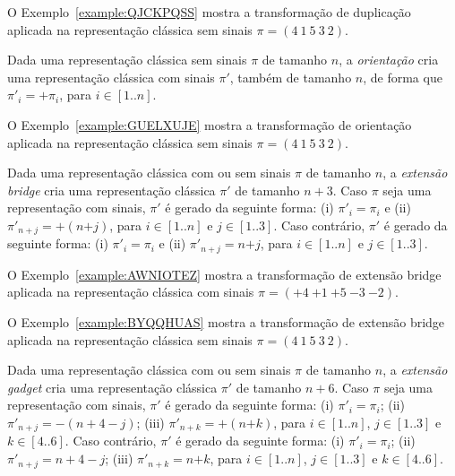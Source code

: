 O Exemplo~\ref{example:QJCKPQSS} mostra a transformação de duplicação aplicada na representação clássica sem sinais $\pi=(4~1~5~3~2)$.



\begin{definition}
Dada uma representação clássica sem sinais $\pi$ de tamanho $n$, a \emph{orientação} cria uma representação clássica com sinais $\pi'$, também de tamanho $n$, de forma que $\pi'_{i} = +\pi_i$, para $i \in [1..n]$.
\end{definition}

O Exemplo~\ref{example:GUELXUJE} mostra a transformação de orientação aplicada na representação clássica sem sinais $\pi=(4~1~5~3~2)$.



\begin{definition}
Dada uma representação clássica com ou sem sinais $\pi$ de tamanho $n$, a \emph{extensão bridge} cria uma representação clássica $\pi'$ de tamanho $n + 3$. Caso $\pi$ seja uma representação com sinais, $\pi'$ é gerado da seguinte forma: (i) $\pi'_{i} = \pi_i$ e (ii) $\pi'_{n+j} = +(n{+j})$, para $i \in [1..n]$ e $j \in [1..3]$. Caso contrário, $\pi'$ é gerado da seguinte forma: (i) $\pi'_{i} = \pi_i$ e (ii) $\pi'_{n+j} = n{+j}$, para $i \in [1..n]$ e $j \in [1..3]$.
\end{definition}

O Exemplo~\ref{example:AWNIOTEZ} mostra a transformação de extensão bridge aplicada na representação clássica com sinais $\pi=({+4}~{+1}~{+5}~{-3}~{-2})$.



O Exemplo~\ref{example:BYQQHUAS} mostra a transformação de extensão bridge aplicada na representação clássica sem sinais $\pi=(4~1~5~3~2)$.



\begin{definition}
Dada uma representação clássica com ou sem sinais $\pi$ de tamanho $n$, a \emph{extensão gadget} cria uma representação clássica $\pi'$ de tamanho $n + 6$. Caso $\pi$ seja uma representação com sinais, $\pi'$ é gerado da seguinte forma: (i) $\pi'_{i} = \pi_i$; (ii) $\pi'_{n+j} = -(n+4-j)$; (iii) $\pi'_{n+k} = +(n{+k})$, para $i \in [1..n]$, $j \in [1..3]$ e $k \in [4..6]$. Caso contrário, $\pi'$ é gerado da seguinte forma: (i) $\pi'_{i} = \pi_i$; (ii) $\pi'_{n+j} = n+4-j$; (iii) $\pi'_{n+k} = n{+k}$, para $i \in [1..n]$, $j \in [1..3]$ e $k \in [4..6]$.
\end{definition}

